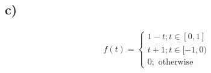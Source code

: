 \documentclass{article}
\begin{document}
\subsection*{c)}
\begin{align*}
    f(t) = \begin{cases}
        1-t; t\in[0,1]\\
        t+1; t\in[-1,0)\\
        0; \text{ otherwise}
    \end{cases}
\end{align*}

\end{document}
